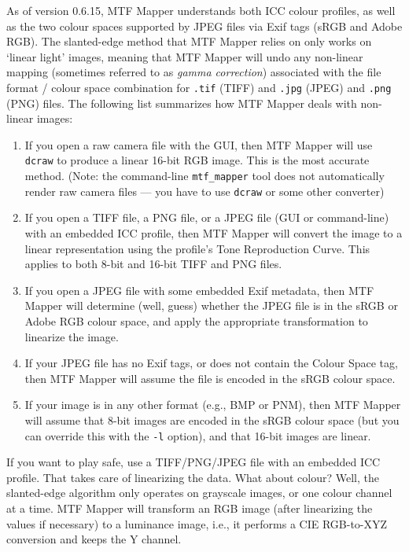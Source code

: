 \documentclass[a4paper]{article}
\begin{document}
As of version 0.6.15, MTF Mapper understands both ICC colour profiles, as
well as the two colour spaces supported by JPEG files via Exif tags (sRGB
and Adobe RGB). The slanted-edge method that MTF Mapper relies on only
works on `linear light' images, meaning that MTF Mapper will undo any
non-linear mapping (sometimes referred to as \emph{gamma correction}) associated with
the file format / colour space combination for \texttt{.tif} (TIFF) and
\texttt{.jpg} (JPEG) and \texttt{.png} (PNG) files. 
The following list summarizes how MTF Mapper deals with non-linear images:
\begin{enumerate}
\item
If you open a raw camera file with the GUI, then MTF Mapper will use
\texttt{dcraw} to produce a linear 16-bit RGB image. This is the most
accurate method. (Note: the command-line \texttt{mtf\_mapper} tool does not
automatically render raw camera files --- you have to use \texttt{dcraw} or
some other converter)
\item
If you open a TIFF file, a PNG file, or a JPEG file  (GUI or command-line)
with an embedded ICC profile, then MTF Mapper will convert the image to a
linear representation using the profile's Tone Reproduction Curve.  This
applies to both 8-bit and 16-bit TIFF and PNG files.
\item
If you open a JPEG file with some embedded Exif metadata, then MTF Mapper
will determine (well, guess) whether the JPEG file is in the sRGB or Adobe
RGB colour space, and apply the appropriate transformation to linearize 
the image.
\item
If your JPEG file has no Exif tags, or does not contain the Colour Space
tag, then MTF Mapper will assume the file is encoded in the sRGB colour space.
\item
If your image is in any other format (e.g., BMP or PNM), then MTF Mapper will 
assume that 8-bit images are encoded in the sRGB colour space (but you can
override this with the \texttt{-l} option), and that
16-bit images are linear.
\end{enumerate}

If you want to play safe, use a TIFF/PNG/JPEG file with an embedded ICC profile.
That takes care of linearizing the data. What about colour? Well, the
slanted-edge algorithm only operates on grayscale images, or one colour
channel at a time. MTF Mapper will transform an RGB image (after linearizing
the values if necessary) to a luminance image, i.e., it performs a CIE
RGB-to-XYZ conversion and keeps the Y channel.
\end{document}
